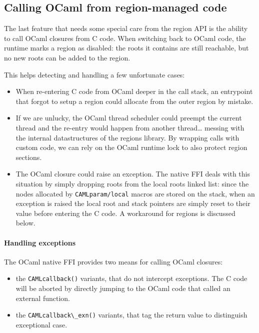 \documentclass[a4paper]{easychair}
\newcommand{\cpp}[1]{\lstinline[style=C++]{#1}}
\begin{document}
\subsection{Calling OCaml from region-managed code}

The last feature that needs some special care from the region API is the
ability to call OCaml closures from C code. When switching back to OCaml
code, the runtime marks a region as disabled: the roots it contains are
still reachable, but no new roots can be added to the region.

This helps detecting and handling a few unfortunate cases:
%
\begin{itemize}
\item When re-entering C code from OCaml deeper in the call stack, an
      entrypoint that forgot to setup a region could allocate from the outer
      region by mistake.
\item If we are unlucky, the OCaml thread scheduler could preempt the
      current thread and the re-entry would happen from another
      thread\ldots{} messing with the internal datastructures of the regions
      library. By wrapping calls with custom code, we can rely on the OCaml
      runtime lock to also protect region sections.
\item The OCaml closure could raise an exception. The native FFI deals with
      this situation by simply dropping roots from the local roots linked
      list: since the nodes allocated by \cpp{CAMLparam/local} macros are
      stored on the stack, when an exception is raised the local root and
      stack pointers are simply reset to their value before entering the C
      code. A workaround for regions is discussed below.
\end{itemize}

\paragraph{Handling exceptions}

The OCaml native FFI provides two means for calling OCaml closures:
%
\begin{itemize}
\item the \cpp{CAMLcallback()} variants, that do not intercept
      exceptions. The C code will be aborted by directly jumping to the
      OCaml code that called an external function.
\item the \cpp{CAMLcallback\_exn()} variants, that tag the return value
      to distinguish exceptional case.
\end{itemize}
\end{document}
